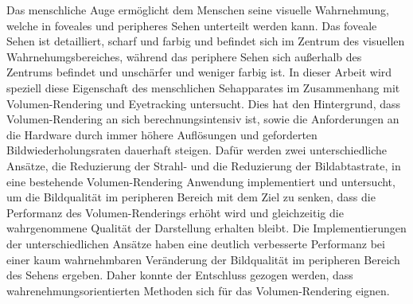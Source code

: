 Das menschliche Auge ermöglicht dem Menschen seine visuelle Wahrnehmung, welche in foveales und peripheres Sehen unterteilt werden kann.
Das foveale Sehen ist detailliert, scharf und farbig und befindet sich im Zentrum des visuellen Wahrnehumgsbereiches, während das periphere Sehen sich außerhalb des Zentrums befindet und unschärfer und weniger farbig ist.
In dieser Arbeit wird speziell diese Eigenschaft des menschlichen Sehapparates im Zusammenhang mit Volumen-Rendering und Eyetracking untersucht.
Dies hat den Hintergrund, dass Volumen-Rendering an sich berechnungsintensiv ist, sowie die Anforderungen an die Hardware durch immer höhere Auflösungen und geforderten Bildwiederholungsraten dauerhaft steigen.
Dafür werden zwei unterschiedliche Ansätze, die Reduzierung der Strahl- und die Reduzierung der Bildabtastrate, in eine bestehende Volumen-Rendering Anwendung implementiert und untersucht, um die Bildqualität im peripheren Bereich mit dem Ziel zu senken, dass die Performanz des Volumen-Renderings erhöht wird und gleichzeitig die wahrgenommene Qualität der Darstellung erhalten bleibt.
Die Implementierungen der unterschiedlichen Ansätze haben eine deutlich verbesserte Performanz bei einer kaum wahrnehmbaren Veränderung der Bildqualität im peripheren Bereich des Sehens ergeben.
Daher konnte der Entschluss gezogen werden, dass wahrenehmungsorientierten Methoden sich für das Volumen-Rendering eignen.